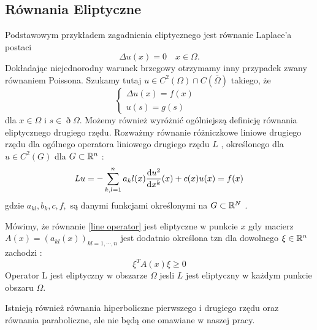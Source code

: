 \documentclass[12pt,a4paper]{report}
\begin{document}
\subsection{Równania Eliptyczne}
Podstawowym przykładem zagadnienia eliptycznego jest równanie Laplace'a postaci 
$$
\Delta u(x) = 0 \quad x \in \Omega. 
$$
Dokładając niejednorodny warunek brzegowy otrzymamy inny przypadek zwany równaniem Poissona. Szukamy tutaj $u \in C^2(\Omega) \cap C(\overline{\Omega})$ takiego, że 
\begin{equation}
\left\{\begin{array}{ll}
\Delta u(x) = f(x) & \\
u(s) = g(s)&
\end{array} \right. 
\end{equation}
dla $x \in \Omega$ i $s \in \eth \Omega$. 
Możemy również wyróżnić ogólniejszą definicję równania eliptycznego drugiego rzędu. Rozważmy równanie różniczkowe liniowe drugiego rzędu dla ogólnego operatora liniowego drugiego rzędu $L$ \label{line operator}, określonego dla $ u \in C^2(G)$ dla $G \subset \mathbb{R}^{n}$ : %
$$
Lu = -\sum_{k,l =1}^{n} a_kl(x) \ddx[u^2]{x^k} (x) + c(x)u(x) = f(x) 
$$
gdzie $ a_{kl}, b_{k}, c, f, $ są danymi funkcjami określonymi na $G \subset \mathbb{R}^N$ .
\begin{definition}
Mówimy, że równanie  \ref{line operator} jest eliptyczne w punkcie $x$ gdy macierz $A(x) = (a_{kl}(x))_{kl=1,\cdots,n}$ jest dodatnio określona tzn dla dowolnego $ \xi \in \mathbb{R}^{n}$ zachodzi :
$$
\xi^{T} A(x) \xi \geq 0
$$
Operator L jest eliptyczny w obszarze $\Omega$ jesli $L$ jest eliptyczny w każdym punkcie obszaru $\Omega$.
\end{definition}
Istnieją również równania hiperboliczne pierwszego i drugiego rzędu oraz równania paraboliczne, ale nie będą one omawiane w naszej pracy. 
\end{document}
